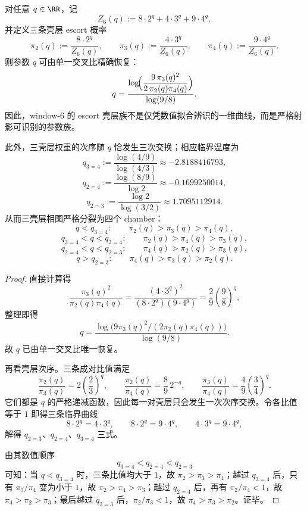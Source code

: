\begin{theorem}\label{thm:xi-time-part9z-window6-escort-projective-identifiability}
对任意 \(q\in\RR\)，记
\[
Z_6(q):=8\cdot 2^q+4\cdot 3^q+9\cdot 4^q,
\]
并定义三条壳层 escort 概率
\[
\pi_2(q):=\frac{8\cdot 2^q}{Z_6(q)},
\qquad
\pi_3(q):=\frac{4\cdot 3^q}{Z_6(q)},
\qquad
\pi_4(q):=\frac{9\cdot 4^q}{Z_6(q)}.
\]
则参数 \(q\) 可由单一交叉比精确恢复：
\[
q=
\frac{
\log\!\Bigl(\dfrac{9\,\pi_3(q)^2}{2\,\pi_2(q)\pi_4(q)}\Bigr)
}{\log(9/8)}.
\]
因此，window-\(6\) 的 escort 壳层族不是仅凭数值拟合辨识的一维曲线，而是严格射影可识别的参数族。

此外，三壳层权重的次序随 \(q\) 恰发生三次交换；相应临界温度为
\[
q_{3=4}:=\frac{\log(4/9)}{\log(4/3)}\approx -2.8188416793,
\]
\[
q_{2=4}:=\frac{\log(8/9)}{\log 2}\approx -0.1699250014,
\]
\[
q_{2=3}:=\frac{\log 2}{\log(3/2)}\approx 1.7095112914.
\]
从而三壳层相图严格分裂为四个 chamber：
\[
q<q_{3=4}:\qquad \pi_2(q)>\pi_3(q)>\pi_4(q),
\]
\[
q_{3=4}<q<q_{2=4}:\qquad \pi_2(q)>\pi_4(q)>\pi_3(q),
\]
\[
q_{2=4}<q<q_{2=3}:\qquad \pi_4(q)>\pi_2(q)>\pi_3(q),
\]
\[
q>q_{2=3}:\qquad \pi_4(q)>\pi_3(q)>\pi_2(q).
\]
\end{theorem}
\begin{proof}
直接计算得
\[
\frac{\pi_3(q)^2}{\pi_2(q)\pi_4(q)}
=
\frac{(4\cdot 3^q)^2}{(8\cdot 2^q)(9\cdot 4^q)}
=
\frac{2}{9}\left(\frac{9}{8}\right)^q,
\]
整理即得
\[
q=
\frac{
\log\!\bigl(9\pi_3(q)^2/(2\pi_2(q)\pi_4(q))\bigr)
}{\log(9/8)}.
\]
故 \(q\) 已由单一交叉比唯一恢复。

再看壳层次序。三条成对比值满足
\[
\frac{\pi_2(q)}{\pi_3(q)}=2\left(\frac{2}{3}\right)^q,
\qquad
\frac{\pi_2(q)}{\pi_4(q)}=\frac{8}{9}\,2^{-q},
\qquad
\frac{\pi_3(q)}{\pi_4(q)}=\frac{4}{9}\left(\frac{3}{4}\right)^q.
\]
它们都是 \(q\) 的严格递减函数，因此每一对壳层只会发生一次次序交换。令各比值等于 \(1\) 即得三条临界曲线
\[
8\cdot 2^q=4\cdot 3^q,
\qquad
8\cdot 2^q=9\cdot 4^q,
\qquad
4\cdot 3^q=9\cdot 4^q,
\]
解得 \(q_{2=3}\)、\(q_{2=4}\)、\(q_{3=4}\) 三式。

由其数值顺序
\[
q_{3=4}<q_{2=4}<q_{2=3}
\]
可知：当 \(q<q_{3=4}\) 时，三条比值均大于 \(1\)，故 \(\pi_2>\pi_3>\pi_4\)；越过 \(q_{3=4}\) 后，只有 \(\pi_3/\pi_4\) 变为小于 \(1\)，故 \(\pi_2>\pi_4>\pi_3\)；越过 \(q_{2=4}\) 后，再有 \(\pi_2/\pi_4<1\)，故 \(\pi_4>\pi_2>\pi_3\)；最后越过 \(q_{2=3}\) 后，\(\pi_2/\pi_3<1\)，故 \(\pi_4>\pi_3>\pi_2\)。证毕。
\end{proof}

